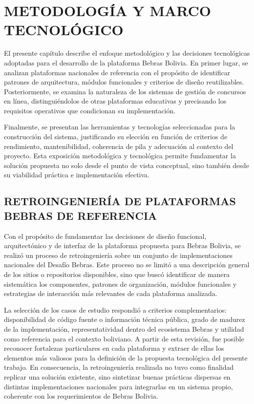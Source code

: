 \chapter{METODOLOGÍA Y MARCO TECNOLÓGICO}

El presente capítulo describe el enfoque metodológico y las decisiones tecnológicas adoptadas para el desarrollo de la plataforma Bebras Bolivia. En primer lugar, se analizan plataformas nacionales de referencia con el propósito de identificar patrones de arquitectura, módulos funcionales y criterios de diseño reutilizables. Posteriormente, se examina la naturaleza de los sistemas de gestión de concursos en línea, distinguiéndolos de otras plataformas educativas y precisando los requisitos operativos que condicionan su implementación.

Finalmente, se presentan las herramientas y tecnologías seleccionadas para la construcción del sistema, justificando su elección en función de criterios de rendimiento, mantenibilidad, coherencia de pila y adecuación al contexto del proyecto. Esta exposición metodológica y tecnológica permite fundamentar la solución propuesta no solo desde el punto de vista conceptual, sino también desde su viabilidad práctica e implementación efectiva.

\section{RETROINGENIERÍA DE PLATAFORMAS BEBRAS DE REFERENCIA}

Con el propósito de fundamentar las decisiones de diseño funcional, arquitectónico y de interfaz de la plataforma propuesta para Bebras Bolivia, se realizó un proceso de retroingeniería sobre un conjunto de implementaciones nacionales del Desafío Bebras. Este proceso no se limitó a una descripción general de los sitios o repositorios disponibles, sino que buscó identificar de manera sistemática los componentes, patrones de organización, módulos funcionales y estrategias de interacción más relevantes de cada plataforma analizada.

La selección de los casos de estudio respondió a criterios complementarios: disponibilidad de código fuente o información técnica pública, grado de madurez de la implementación, representatividad dentro del ecosistema Bebras y utilidad como referencia para el contexto boliviano. A partir de esta revisión, fue posible reconocer fortalezas particulares en cada plataforma y extraer de ellas los elementos más valiosos para la definición de la propuesta tecnológica del presente trabajo. En consecuencia, la retroingeniería realizada no tuvo como finalidad replicar una solución existente, sino sintetizar buenas prácticas dispersas en distintas implementaciones nacionales para integrarlas en un sistema propio, coherente con los requerimientos de Bebras Bolivia.

